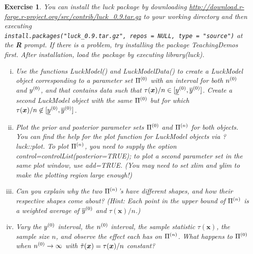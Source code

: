 \documentclass[12pt,a4paper	,twoside]{article}
\newcommand{\bs}[1]{\boldsymbol{#1}}
\renewcommand{\vec}[1]{{\bs#1}}
\newcommand{\code}[1]{\emph{\ttfamily #1}}
\newtheorem{myex}{Exercise}
\begin{document}
\begin{myex}
You can install the \code{luck} package 
by downloading \emph{\url{http://download.r-forge.r-project.org/src/contrib/luck_0.9.tar.gz}}
to your working directory and then executing\\
\verb+install.packages("luck_0.9.tar.gz", repos = NULL, type = "source")+
at the \textbf{R} prompt.
If there is a problem, try installing the package \code{TeachingDemos} first.
After installation, load the package by executing \code{library(luck)}.
\begin{enumerate}[(i)]
\item Use the functions \code{LuckModel()} and \code{LuckModelData()}
to create a \code{LuckModel} object corresponding to a parameter set $\Pi^{(0)}$ with an interval for both $n^{(0)}$ and $y^{(0)}$,
and that contains data such that $\tau(\vec{x})/n \in [\yzl, \yzu]$.
Create a second \code{LuckModel} object with the same $\Pi^{(0)}$ but for which $\tau(\vec{x})/n \not\in [\yzl, \yzu]$.
\item Plot the prior and posterior parameter sets $\Pi^{(0)}$ and $\Pi^{(n)}$ for both objects.
You can find the help for the plot function for \code{LuckModel} objects via \code{?luck::plot}.
To plot $\Pi^{(n)}$, you need to supply the option \code{control=controlList(posterior=TRUE)};
to plot a second parameter set in the same plot window, use \code{add=TRUE}.
(You may need to set \code{xlim} and \code{ylim} to make the plotting region large enough!)
\item Can you explain why the two $\Pi^{(n)}$'s have different shapes,
and how their respective shapes come about?
(Hint: Each point in the upper bound of $\Pi^{(n)}$ is a weighted average of $\overline{y}^{(0)}$ and $\tau(\vec{x})/n$.)
\item Vary the $y^{(0)}$ interval, the $n^{(0)}$ interval, the sample statistic $\tau(\vec{x})$, the sample size $n$,
and observe the effect each has on $\Pi^{(n)}$.
What happens to $\Pi^{(0)}$ when $n^{(0)} \to \infty$ with $\ttau(\vec{x}) = \tau(\vec{x})/n$ constant?
\end{enumerate}
\end{myex}
\end{document}
